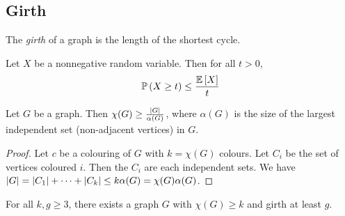\subsection{Girth}
\begin{definition}
	The \emph{girth} of a graph is the length of the shortest cycle.
\end{definition}
\begin{proposition}[Markov]
	Let \( X \) be a nonnegative random variable.
	Then for all \( t > 0 \),
	\[ \mathbb{P}\left({X \geq t}\right) \leq \frac{\mathbb{E}\left[{X}\right]}{t} \]
\end{proposition}
\begin{proposition}
	Let \( G \) be a graph.
	Then \( \chi(G) \geq \frac{\abs{G}}{\alpha(G)} \), where \( \alpha(G) \) is the size of the largest independent set (non-adjacent vertices) in \( G \).
\end{proposition}
\begin{proof}
	Let \( c \) be a colouring of \( G \) with \( k = \chi(G) \) colours.
	Let \( C_i \) be the set of vertices coloured \( i \).
	Then the \( C_i \) are each independent sets.
	We have \( \abs{G} = \abs{C_1} + \dots + \abs{C_k} \leq k\alpha(G) = \chi(G)\alpha(G) \).
\end{proof}
\begin{theorem}[Erd\H{o}s]
	For all \( k, g \geq 3 \), there exists a graph \( G \) with \( \chi(G) \geq k \) and girth at least \( g \).
\end{theorem}

